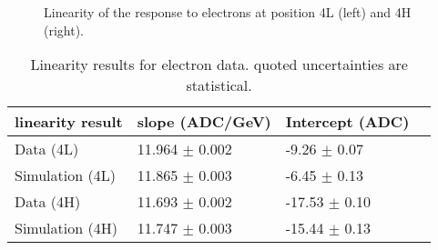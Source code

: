 \begin{figure}[!htb]
\begin{center}
\caption{Linearity of the response to electrons at position 4L (left) and 4H (right). }
\end{center}
\label{TBplot_electron_linearity}
\end{figure}

\begin{table}[!htb]
\begin{center}
\begin{tabular}{|l|l|l|l|}
\hline
linearity result & slope (ADC/GeV)& Intercept (ADC) \\
\hline
Data (4L) & 11.964 $\pm$ 0.002 & -9.26 $\pm$ 0.07 \\
Simulation (4L) & 11.865 $\pm$ 0.003 & -6.45 $\pm$ 0.13 \\
Data (4H) & 11.693 $\pm$ 0.002 & -17.53 $\pm$ 0.10 \\
Simulation (4H) & 11.747 $\pm$ 0.003 & -15.44 $\pm$ 0.13 \\
\hline
\end{tabular}
\caption{Linearity results for electron data. quoted uncertainties are statistical.}
\label{table_electron_c8_linearity}
\end{center}
\end{table}



